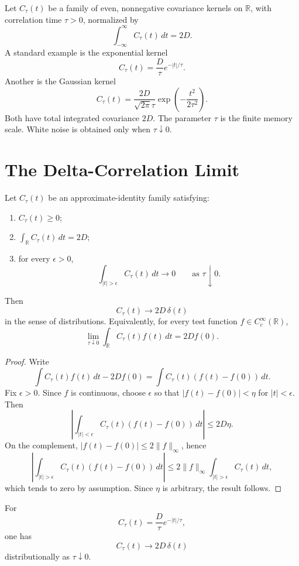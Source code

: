 \documentclass[11pt]{article}
\begin{document}
Let \(C_\tau(t)\) be a family of even, nonnegative covariance kernels on \(\mathbb R\), with correlation time \(\tau>0\), normalized by
\[
\int_{-\infty}^{\infty} C_\tau(t)\,dt = 2D .
\]
A standard example is the exponential kernel
\[
C_\tau(t)=\frac{D}{\tau}e^{-|t|/\tau}.
\]
Another is the Gaussian kernel
\[
C_\tau(t)=\frac{2D}{\sqrt{2\pi}\tau}\exp\!\left(-\frac{t^2}{2\tau^2}\right).
\]
Both have total integrated covariance \(2D\). The parameter \(\tau\) is the finite memory scale. White noise is obtained only when \(\tau\downarrow 0\).

\section{The Delta-Correlation Limit}

\begin{theorem}
Let \(C_\tau(t)\) be an approximate-identity family satisfying:
\begin{enumerate}
\item \(C_\tau(t)\ge 0\);
\item \(\int_{\mathbb R} C_\tau(t)\,dt=2D\);
\item for every \(\epsilon>0\),
\[
\int_{|t|>\epsilon} C_\tau(t)\,dt\to 0
\qquad\text{as }\tau\downarrow 0 .
\]
\end{enumerate}
Then
\[
C_\tau(t)\to 2D\,\delta(t)
\]
in the sense of distributions. Equivalently, for every test function \(f\in C_c^\infty(\mathbb R)\),
\[
\lim_{\tau\downarrow 0}\int_{\mathbb R} C_\tau(t)f(t)\,dt=2D f(0).
\]
\end{theorem}

\begin{proof}
Write
\[
\int C_\tau(t)f(t)\,dt-2Df(0)
=
\int C_\tau(t)(f(t)-f(0))\,dt.
\]
Fix \(\epsilon>0\). Since \(f\) is continuous, choose \(\epsilon\) so that \(|f(t)-f(0)|<\eta\) for \(|t|<\epsilon\). Then
\[
\left|\int_{|t|<\epsilon} C_\tau(t)(f(t)-f(0))\,dt\right|
\le 2D\eta .
\]
On the complement, \(|f(t)-f(0)|\le 2\|f\|_\infty\), hence
\[
\left|\int_{|t|>\epsilon} C_\tau(t)(f(t)-f(0))\,dt\right|
\le 2\|f\|_\infty\int_{|t|>\epsilon}C_\tau(t)\,dt,
\]
which tends to zero by assumption. Since \(\eta\) is arbitrary, the result follows.
\end{proof}

\begin{corollary}
For
\[
C_\tau(t)=\frac{D}{\tau}e^{-|t|/\tau},
\]
one has
\[
C_\tau(t)\to 2D\,\delta(t)
\]
distributionally as \(\tau\downarrow 0\).
\end{corollary}
\end{document}
